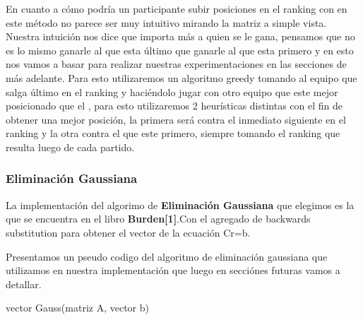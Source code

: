 En cuanto a cómo podría un participante subir posiciones en el ranking con en este método no parece ser muy intuitivo mirando la matriz a simple vista. Nuestra intuición nos dice que importa más a quien se le gana, pensamos que no es lo mismo ganarle al que esta último que ganarle al que esta primero
y en esto nos vamos a basar para realizar nuestras experimentaciones en las secciones de más adelante.
Para esto utilizaremos un algoritmo greedy tomando al equipo que salga último en el ranking y haciéndolo jugar con otro equipo que este mejor posicionado que el , para esto utilizaremos 2 heurísticas distintas
con el fin de obtener una mejor posición, la primera será contra el inmediato siguiente en el ranking y la otra contra el que este primero, siempre tomando el ranking que resulta luego de cada partido.

\subsubsection{Eliminación Gaussiana}
La implementación del algorimo de \textbf{Eliminación Gaussiana} que elegimos es la que se encuentra en el libro \textbf{Burden[1]}.Con el agregado de backwards substitution para 
obtener el vector de la ecuaci\'on Cr=b.

Presentamos un pseudo codigo del algoritmo de eliminaci\'on gaussiana que utilizamos en nuestra implementaci\'on que luego en secci\'ones futuras vamos a detallar.

\begin{algorithm}
    \begin{algorithmic}[1]\parskip=2mm
        \caption{vector Gauss(matriz A, vector b)}
        \\
        \\
        \\
        \\
        \\
        \\
        \\
        \\
        \\
        \\
    \end{algorithmic}
\end{algorithm}

